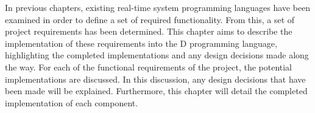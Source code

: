 








In previous chapters,
existing real-time system programming languages have been examined in order to
define a set of required functionality. From this, a set of project requirements 
has been determined. 
This chapter aims to describe the implementation of these requirements into the D
programming language, highlighting the completed implementations and any design 
decisions made along the way. 
For each of the functional requirements of the project, the potential
implementations are discussed. In this discussion, any design 
decisions that have been made will be explained. Furthermore, this chapter will 
detail the completed implementation of each component. 

